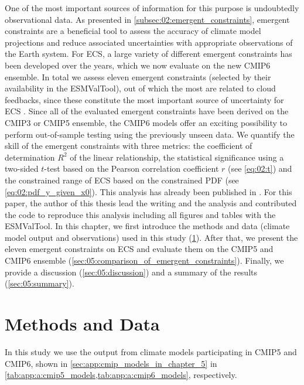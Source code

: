 One of the most important sources of information for this purpose is
undoubtedly observational data. As presented in
\cref{subsec:02:emergent_constraints}, emergent constraints are a beneficial
tool to assess the accuracy of climate model projections and reduce associated
uncertainties with appropriate observations of the Earth system. For \ac{ECS},
a large variety of different emergent constraints has been developed over the
years, which we now evaluate on the new \acs{CMIP}6 ensemble. In total we
assess eleven emergent constraints (selected by their availability in the
\ac{ESMValTool}), out of which the most are related to cloud feedbacks, since
these constitute the most important source of uncertainty for \ac{ECS}
. Since all of the evaluated emergent
constraints have been derived on the \acs{CMIP}3 or \ac{CMIP}5 ensemble, the
\ac{CMIP}6 models offer an exciting possibility to perform out-of-sample
testing using the previously unseen data. We quantify the skill of the emergent
constraints with three metrics: the coefficient of determination $R^2$ of the
linear relationship, the statistical significance using a two-sided $t$-test
based on the Pearson correlation coefficient $r$ (see \cref{eq:02:t}) and the
constrained range of \ac{ECS} based on the constrained \ac{PDF} (see
\cref{eq:02:pdf_y_given_x0}). This analysis has already been published in
\textcite{Schlund2020a}. For this paper, the author of this thesis lead the
writing and the analysis and contributed the code to reproduce this analysis
including all figures and tables with the \ac{ESMValTool}. In this chapter, we
first introduce the methods and data (climate model output and observations)
used in this study (\cref{sec:05:methods_and_data}). After that, we present the
eleven emergent constraints on \acs{ECS} and evaluate them on the \acs{CMIP}5
and \acs{CMIP}6 ensemble (\cref{sec:05:comparison_of_emergent_constraints}).
Finally, we provide a discussion (\cref{sec:05:discussion}) and a summary of
the results (\cref{sec:05:summary}).


\section{Methods and Data}
\label{sec:05:methods_and_data}

In this study we use the output from climate models participating in
\acs{CMIP}5 and \acs{CMIP}6, shown in \cref{sec:app:cmip_models_in_chapter_5}
in \cref{tab:app:a:cmip5_models,tab:app:a:cmip6_models}, respectively.


